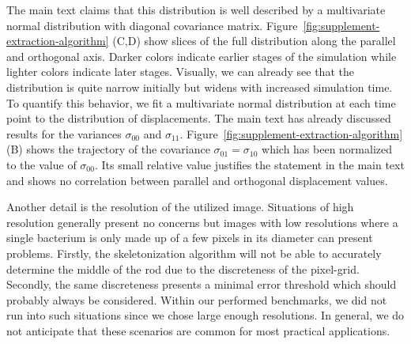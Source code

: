 The main text claims that this distribution is well described by a multivariate
normal distribution
with diagonal covariance matrix.
Figure~\ref{fig:supplement-extraction-algorithm} (C,D) show slices of the full
distribution along
the parallel and orthogonal axis.
Darker colors indicate earlier stages of the simulation while lighter colors indicate
later stages.
Visually, we can already see that the distribution is quite narrow initially but widens with
increased simulation time.
To quantify this behavior, we fit a multivariate normal distribution at each time point to the
distribution of displacements.
The main text has already discussed results for the variances $\sigma_{00}$ and $\sigma_{11}$.
Figure~\ref{fig:supplement-extraction-algorithm} (B) shows the trajectory of the covariance
$\sigma_{01}=\sigma_{10}$ which has been normalized to the value of $\sigma_{00}$.
Its small relative value justifies the statement in the main text and shows no
correlation between
parallel and orthogonal displacement values.

Another detail is the resolution of the utilized image.
Situations of high resolution generally present no concerns but images with low
resolutions where a
single bacterium is only made up of a few pixels in its diameter can present problems.
Firstly, the skeletonization algorithm will not be able to accurately determine the
middle of the
rod due to the discreteness of the pixel-grid.
Secondly, the same discreteness presents a minimal error threshold which should
probably always be
considered.
Within our performed benchmarks, we did not run into such situations since we chose large enough
resolutions.
In general, we do not anticipate that these scenarios are common for most practical
applications.

